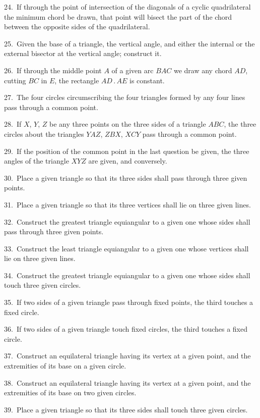 \documentclass[oneside]{book}
\begin{document}
\begin{footnotesize}
24.~If through the point of intersection of the diagonals of a
cyclic quadrilateral the minimum chord be drawn, that point will
bisect the part of the chord between the opposite sides of the
quadrilateral.

25.~Given the base of a triangle, the vertical angle, and either
the internal or the external bisector at the vertical angle; construct
it.

26.~If through the middle point $A$ of a given arc $BAC$ we
draw any chord $AD$, cutting $BC$ in $E$, the rectangle $AD\,.\,AE$ is
constant.

27.~The four circles circumscribing the four triangles formed
by any four lines pass through a common point.

28.~If $X$, $Y$, $Z$ be any three points on the three sides of a triangle
$ABC$, the three circles about the triangles $YAZ$, $ZBX$, $XCY$
pass through a common point.

29.~If the position of the common point in the last question be
given, the three angles of the triangle $XYZ$ are given, and conversely.

30.~Place a given triangle so that its three sides shall pass
through three given points.

31.~Place a given triangle so that its three vertices shall lie on
three given lines.

32.~Construct the greatest triangle equiangular to a given one
whose sides shall pass through three given points.

33.~Construct the least triangle equiangular to a given one
whose vertices shall lie on three given lines.

34.~Construct the greatest triangle equiangular to a given one
whose sides shall touch three given circles.

35.~If two sides of a given triangle pass through fixed points,
the third touches a fixed circle.

36.~If two sides of a given triangle touch fixed circles, the
third touches a fixed circle.

37.~Construct an equilateral triangle having its vertex at a
given point, and the extremities of its base on a given circle.

38.~Construct an equilateral triangle having its vertex at a
given point, and the extremities of its base on two given circles.

39.~Place a given triangle so that its three sides shall touch
three given circles.


\end{footnotesize}
\end{document}
